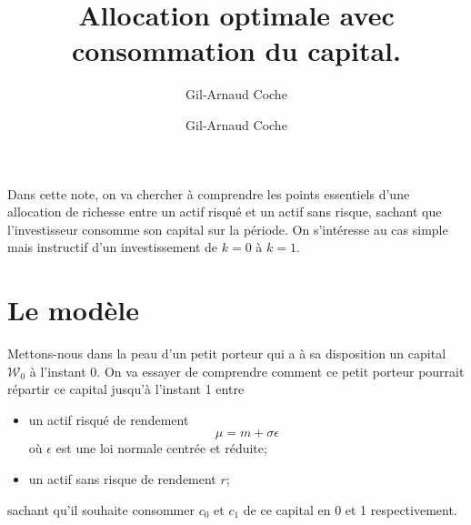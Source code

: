\documentclass{article}
\author{Gil-Arnaud Coche}
\numberwithin{equation}{section}
\begin{document}
\newtheorem{hyp}{Hypothese}
\newtheorem*{hyp*}{Hypothese}

{}
{}
{\pgfpoint{\size}{\size}}
{
  \pgfsetlinewidth{\thickness}
  \pgfpathcircle{}
}
\newdimen\thickness
{}

\newcommand{\W}{\mathcal{W}}
\newcommand{\G}{\mathcal{G}}
\newcommand{\N}{\mathcal{N}}
\newcommand{\diff}{\textnormal{d}}

\title{Allocation optimale avec consommation du capital.}

\author{Gil-Arnaud Coche}
\maketitle

Dans cette note, on va chercher à comprendre les points essentiels d'une allocation de richesse entre un actif risqué et un actif sans risque, sachant que l'investisseur consomme son capital sur la période. On s'intéresse au cas simple mais instructif d'un investissement de $k = 0$ à $k = 1$.\\

\section{Le modèle}

Mettons-nous dans la peau d'un petit porteur qui a à sa disposition un capital $\W_0$ à l'instant 0. On va essayer de comprendre comment ce petit porteur pourrait répartir ce capital jusqu'à l'instant 1 entre 
\begin{itemize}
\item un actif risqué de rendement 
$$
\mu = m + \sigma\epsilon
$$
où $\epsilon$ est une loi normale centrée et réduite;
\item un actif sans risque de rendement $r$;
\end{itemize}
sachant qu'il souhaite consommer $c_0$ et $c_1$ de ce capital en 0 et 1 respectivement.
\end{document}
